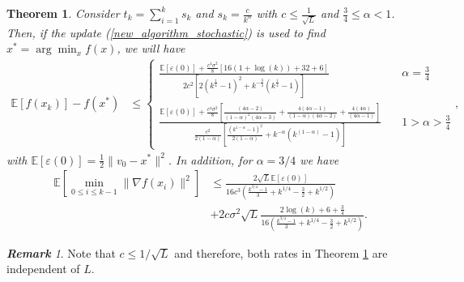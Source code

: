 \documentclass{article}
\theoremstyle{plain}
\newtheorem{thm}{\textbf{Theorem}}
\theoremstyle{definition}
\theoremstyle{remark}
\newtheorem*{rem}{\bf Remark}
\begin{document}
\begin{thm}\label{Theorem5}
    Consider $t_k=\sum_{i=1}^k s_k $ and $s_k=\frac{c}{k^{\alpha}}$ with $c\leq \frac{1}{\sqrt{L}}$ and $\frac{3}{4}\leq\alpha<1$. Then, if the update (\ref{new_algorithm_stochastic}) is used to find $x^*=\arg\min_x f(x)$, we will have
    \begin{align}\label{conv_rate1_them6}
    \mathbb E[f(x_k)]-f(x^*)&\leq \left\{\begin{array}{lr}
         \frac{\mathbb E[\varepsilon (0)]+\frac{c^4\sigma^2}{8}\left[16(1+\log(k))+32+6\right]}{2c^2\left[2(k^{\frac{1}{4}}-1)^2+k^{-\frac{3}{4}}(k^{\frac{1}{4}}-1)\right]} & \quad \alpha=\frac{3}{4} \\
          \frac{\mathbb E[\varepsilon (0)]+\frac{c^4\sigma^2}{8}\left[\frac{(4\alpha -2)}{(1-\alpha)^2(4\alpha-3)}+\frac{4(4\alpha -1)}{(1-\alpha)(4\alpha -2)}+\frac{4(4\alpha )}{(4\alpha -1)}\right]}{\frac{c^2}{2(1-\alpha)}\left[\frac{(k^{1-\alpha}-1)^2}{2(1-\alpha)}+k^{-\alpha}(k^{(1-\alpha)}-1)\right]}& \quad 1>\alpha>\frac{3}{4}
    \end{array}\right.,
\end{align}
with $\mathbb E[\varepsilon (0)]=\frac{1}{2}\|v_0-x^*\|^2$. In addition, for $\alpha = 3/4$ we have
\begin{align}\label{conv_rate2_them6}
    \mathbb E\left[\min_{0\leq i\leq k-1}\|\nabla f(x_i)\|^2 \right] &\leq \frac{2\sqrt{L}\mathbb E[\varepsilon (0)]}{16c^3\left( \frac{k^{3/4}-1}{3} +k^{1/4}-\frac{3}{2}+k^{1/2}\right)}\nonumber\\
    &+2c\sigma^2\sqrt{L}\frac{2\log (k)+6+\frac{3}{4}}{16\left( \frac{k^{3/4}-1}{3} +k^{1/4}-\frac{3}{2}+k^{1/2}\right)}.
\end{align}
\end{thm}
\begin{rem}
Note that $c\leq 1/\sqrt{L}$ and therefore, both rates in Theorem \ref{Theorem5} are independent of $L$. 
\end{rem}
\end{document}
